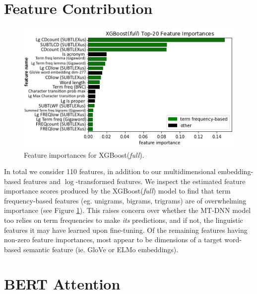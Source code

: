 \documentclass{dcthesis}
\theoremstyle{definition}
\theoremstyle{remark}
\begin{document}
\section{Feature Contribution}

\begin{figure}
  \centering
  \includegraphics[scale=0.85]{xgboost_feature_importances.png}
  \captionsetup{justification=centering}
  \caption{\label{fig:xgboost_feature_importance} Feature importances for XGBoost(\textit{full}).}
\end{figure}

In total we consider 110 features, in addition to our multidimensional embedding-based features and $\log$-transformed features. We inspect the estimated feature importance scores produced by the XGBoost(\textit{full}) model to find that term frequency-based features (eg. unigrams, bigrams, trigrams) are of overwhelming importance (see Figure \ref{fig:xgboost_feature_importance}). This raises concern over whether the MT-DNN model too relies on term frequencies to make \textit{its} predictions, and if not, the linguistic features it may have learned upon fine-tuning. Of the remaining features having non-zero feature importances, most appear to be dimensions of a target word-based semantic feature (ie. GloVe or ELMo embeddings).

\section{BERT Attention}
\label{sec:bert_attention}
\end{document}
